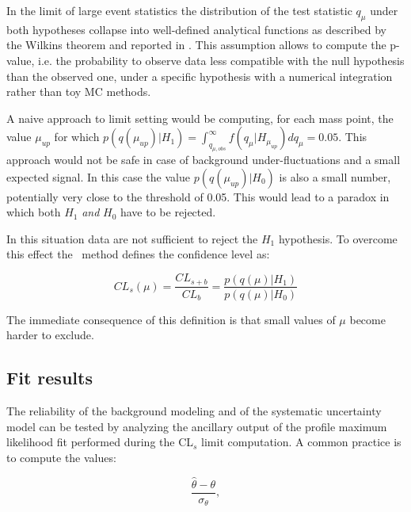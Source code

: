 In the limit of large event statistics the distribution of the test statistic $q_\mu$ under both hypotheses collapse into well-defined analytical functions as described by the Wilkins theorem and reported in \cite{Cowan:2010js, higgscombo}. This assumption allows to compute the p-value, i.e. the probability to observe data less compatible with the null hypothesis than the observed one, under a specific hypothesis with a numerical integration rather than toy MC methods.

A naive approach to limit setting would be computing, for each mass point, the value $\mu_{up}$ for which $p(q(\mu_{up}) | H_1) = \int_{q_{\mu,obs}}^{\infty}f(q_\mu|H_{\mu_{up}})dq_\mu = 0.05$. This approach would not be safe in case of background under-fluctuations and a small expected signal. In this case the value $p(q(\mu_{up}) | H_0)$ is also a small number, potentially very close to the threshold of 0.05. This would lead to a paradox in which both $H_1$ \emph{and} $H_0$ have to be rejected.

In this situation data are not sufficient to reject the $H_1$ hypothesis. To overcome this effect the \CLs\ method defines the confidence level as:

\begin{equation}
CL_s(\mu) = \dfrac{CL_{s+b}}{CL_b} = \dfrac{p(q(\mu) | H_1)}{p(q(\mu) | H_0)}
\end{equation}

The immediate consequence of this definition is that small values of $\mu$ become harder to exclude.

\subsection{Fit results}

The reliability of the background modeling and of the systematic uncertainty model can be tested by analyzing the ancillary output of the profile maximum likelihood fit performed during the CL$_s$ limit computation. A common practice is to compute the values:

\begin{equation}
\dfrac{\hat{\theta} - \theta}{\sigma_{\theta}},
\end{equation}

